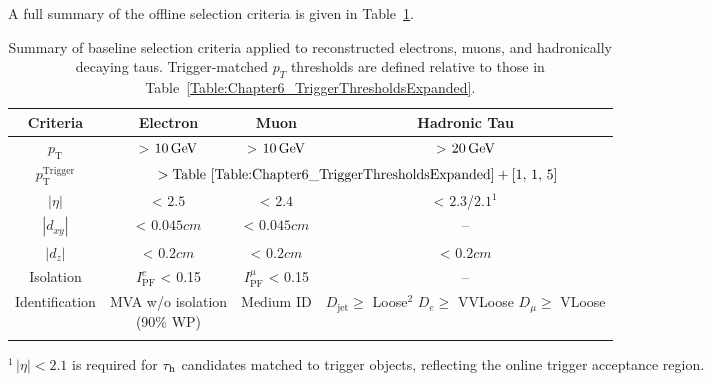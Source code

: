 A full summary of the offline selection criteria is given in Table~\ref{Table:Chapter6_ObjectSelectionSummary}.

{
\setlength{\arrayrulewidth}{1pt}

\begin{table}[!htbp]
\centering
\caption[Summary of baseline object selection criteria]{
Summary of baseline selection criteria applied to reconstructed electrons, muons, and hadronically decaying taus. Trigger-matched $p_T$ thresholds are defined relative to those in Table~\ref{Table:Chapter6_TriggerThresholdsExpanded}.
}
\label{Table:Chapter6_ObjectSelectionSummary}

\renewcommand{\arraystretch}{1.5}
\setlength{\tabcolsep}{12pt}

\begin{tabular}{cccc}
\hline
Criteria & Electron & Muon & Hadronic Tau \\
\hline

$p_\text{T}$  & > $10\,\text{Ge\hspace{-.08em}V}$ & > $10\,\text{Ge\hspace{-.08em}V}$ & > $20\,\text{Ge\hspace{-.08em}V}$\\ 
\arrayrulecolor{lightgray} \hline

$p_\text{T}^{\text{Trigger}}$ & \multicolumn{3}{c}{$> \text{Table~\ref{Table:Chapter6_TriggerThresholdsExpanded}} + [1,\,1,\,5]$} \\
\arrayrulecolor{lightgray} \hline

$|\eta|$ & < $2.5$ & < $2.4$ & < $2.3$/$2.1$\hyperlink{DoubleTauTrigger-EtaCut}{$^1$} \\
\arrayrulecolor{lightgray} \hline

$|d_{xy}|$ & < $0.045\unit{cm}$ & < $0.045\unit{cm}$ & -- \\
\arrayrulecolor{lightgray} \hline

$|d_z|$ & < $0.2\unit{cm}$ & < $0.2\unit{cm}$ & < $0.2\unit{cm}$ \\
\arrayrulecolor{lightgray} \hline

Isolation & $I^e_\text{PF}$ < 0.15 & $I^\mu_\text{PF}$ < 0.15 & -- \\
\arrayrulecolor{lightgray} \hline

Identification
& \makecell{\ac{MVA} w/o isolation\\(90\% \ac{WP})}
& Medium ID
& \makecell{
\normalfont\footnotesize$D_{\text{jet}} \geq$ Loose\hyperlink{Alternative-FFcut}{$^2$} \\
\normalfont\footnotesize$D_{e} \geq$ VVLoose \\
\normalfont\footnotesize$D_{\mu} \geq$ VLoose
} \\
\arrayrulecolor{black} \hline
\end{tabular}
\vspace{0.5em}
\begin{minipage}{0.95\linewidth}
\raggedright
\footnotesize
\hypertarget{DoubleTauTrigger-EtaCut}{}$^{1}$\,$|\eta| < 2.1$ is required for $\tau_\mathrm{h}$ candidates matched to trigger objects, reflecting the online trigger acceptance region. \\


\end{minipage}
\end{table}}

